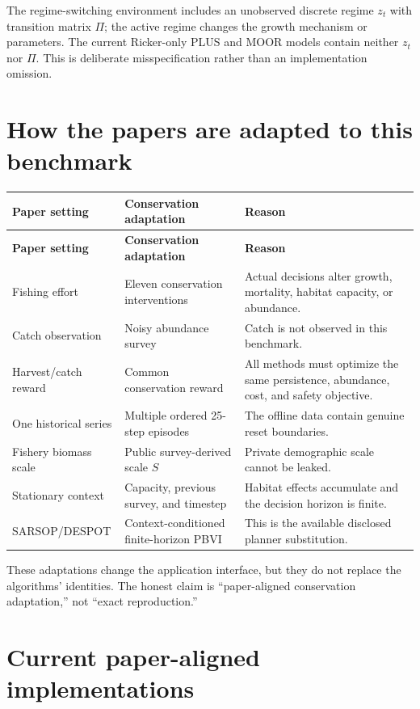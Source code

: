 \documentclass[11pt]{article}
\begin{document}
The regime-switching environment includes an unobserved discrete regime $z_t$ with transition
matrix $\Pi$; the active regime changes the growth mechanism or parameters. The current Ricker-only
PLUS and MOOR models contain neither $z_t$ nor $\Pi$. This is deliberate misspecification rather
than an implementation omission.

\section{How the papers are adapted to this benchmark}

\begin{longtable}{L{0.23\textwidth}L{0.29\textwidth}L{0.38\textwidth}}
\toprule
\textbf{Paper setting} & \textbf{Conservation adaptation} & \textbf{Reason} \\
\midrule
\endfirsthead
\toprule
\textbf{Paper setting} & \textbf{Conservation adaptation} & \textbf{Reason} \\
\midrule
\endhead
Fishing effort & Eleven conservation interventions & Actual decisions alter growth, mortality, habitat capacity, or abundance. \\
Catch observation & Noisy abundance survey & Catch is not observed in this benchmark. \\
Harvest/catch reward & Common conservation reward & All methods must optimize the same persistence, abundance, cost, and safety objective. \\
One historical series & Multiple ordered 25-step episodes & The offline data contain genuine reset boundaries. \\
Fishery biomass scale & Public survey-derived scale $S$ & Private demographic scale cannot be leaked. \\
Stationary context & Capacity, previous survey, and timestep & Habitat effects accumulate and the decision horizon is finite. \\
SARSOP/DESPOT & Context-conditioned finite-horizon PBVI & This is the available disclosed planner substitution. \\
\bottomrule
\end{longtable}

These adaptations change the application interface, but they do not replace the algorithms'
identities. The honest claim is ``paper-aligned conservation adaptation,'' not ``exact
reproduction.''

\section{Current paper-aligned implementations}
\end{document}
